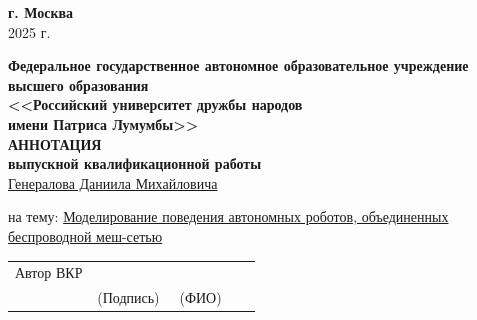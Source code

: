 \documentclass[%
]{report}
\begin{document}
\begin{titlepage}
  \begin{center} \textbf{г. Москва} \\ 2025 г. \end{center}
  \thispagestyle{empty} %
   
  \end{titlepage}
   \newpage

\begin{center}
  \textbf{Федеральное государственное автономное образовательное учреждение высшего образования} \\
  \textbf{<<Российский университет дружбы народов}\\
  \textbf{имени Патриса Лумумбы>>}\\

  \large \textbf{АННОТАЦИЯ}\\
  \normalsize \textbf{выпускной квалификационной работы} \\

  \underline{Генералова Даниила Михайловича}
\end{center}

на тему: \underline{Моделирование поведения автономных роботов, объединенных беспроводной меш-сетью}

\lipsum[1-4]

\vspace*{\fill}

\noindent \begin{tabular}{p{0.33\linewidth} p{0.33\linewidth} p{0.33\linewidth}}
Автор ВКР & \underline{\phantom{signature sign}} & \underline{\phantom{Генералов Даниил Михайлович}} \\
& (Подпись) & (ФИО)
\end{tabular}

\thispagestyle{empty} 

\newpage
\setcounter{page}{3}  

\tableofcontents

\newpage


\end{document}
